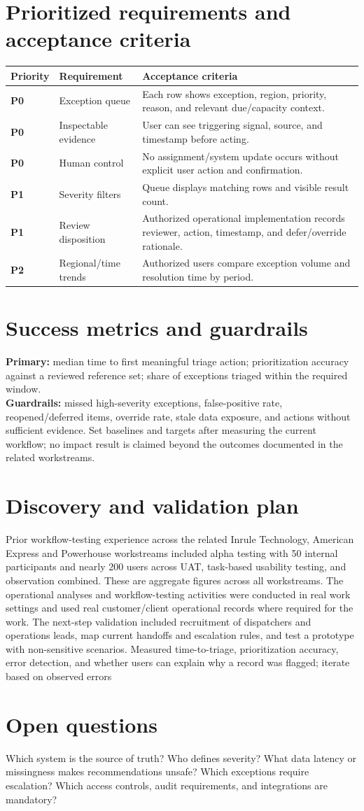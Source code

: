 \documentclass[10pt,a4paper]{article}
\begin{document}
\section{Prioritized requirements and acceptance criteria}
\small\begin{tabularx}{\linewidth}{>{\bfseries}p{0.55in} X X}\hline Priority & Requirement & Acceptance criteria\\\hline
P0 & Exception queue & Each row shows exception, region, priority, reason, and relevant due/capacity context.\\
P0 & Inspectable evidence & User can see triggering signal, source, and timestamp before acting.\\
P0 & Human control & No assignment/system update occurs without explicit user action and confirmation.\\
P1 & Severity filters & Queue displays matching rows and visible result count.\\
P1 & Review disposition & Authorized operational implementation records reviewer, action, timestamp, and defer/override rationale.\\
P2 & Regional/time trends & Authorized users compare exception volume and resolution time by period.\\\hline\end{tabularx}\normalsize
\section{Success metrics and guardrails}
\textbf{Primary:} median time to first meaningful triage action; prioritization accuracy against a reviewed reference set; share of exceptions triaged within the required window.\\
\textbf{Guardrails:} missed high-severity exceptions, false-positive rate, reopened/deferred items, override rate, stale data exposure, and actions without sufficient evidence. Set baselines and targets after measuring the current workflow; no impact result is claimed beyond the outcomes documented in the related workstreams.
\section{Discovery and validation plan}
Prior workflow-testing experience across the related Inrule Technology, American Express and Powerhouse workstreams included alpha testing with 50 internal participants and nearly 200 users across UAT, task-based usability testing, and observation combined. These are aggregate figures across all workstreams. The operational analyses and workflow-testing activities were conducted in real work settings and used real customer/client operational records where required for the work. The next-step validation included recruitment of dispatchers and operations leads, map current handoffs and escalation rules, and test a prototype with non-sensitive scenarios. Measured time-to-triage, prioritization accuracy, error detection, and whether users can explain why a record was flagged; iterate based on observed errors
\section{Open questions}
Which system is the source of truth? Who defines severity? What data latency or missingness makes recommendations unsafe? Which exceptions require escalation? Which access controls, audit requirements, and integrations are mandatory?
\end{document}
